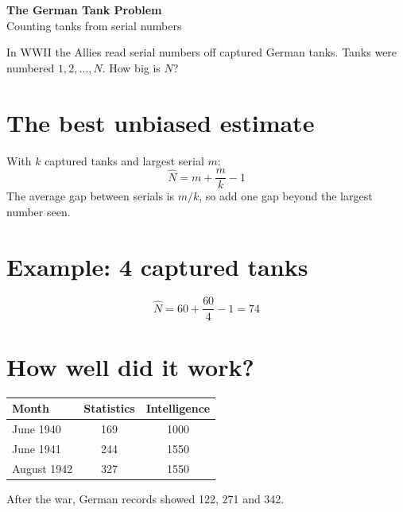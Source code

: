 \documentclass[11pt]{article}
\begin{document}
\begin{center}
  {\LARGE\bfseries The German Tank Problem}\\[4pt]
  {\large Counting tanks from serial numbers}
\end{center}

In WWII the Allies read serial numbers off captured German
tanks. Tanks were numbered \(1, 2, \dots, N\). How big is \(N\)?

\section*{The best unbiased estimate}
With \(k\) captured tanks and largest serial \(m\):
\[
  \hat N = m + \frac{m}{k} - 1
\]
The average gap between serials is \(m/k\), so add one gap
beyond the largest number seen.

\section*{Example: 4 captured tanks}
\begin{center}
\end{center}
\[
  \hat N = 60 + \frac{60}{4} - 1 = 74
\]

\section*{How well did it work?}
\begin{center}
\begin{tabular}{lcc}
  \hline
  Month & Statistics & Intelligence \\
  \hline
  June 1940 & 169 & 1000 \\
  June 1941 & 244 & 1550 \\
  August 1942 & 327 & 1550 \\
  \hline
\end{tabular}
\end{center}
After the war, German records showed 122, 271 and 342.
\end{document}
